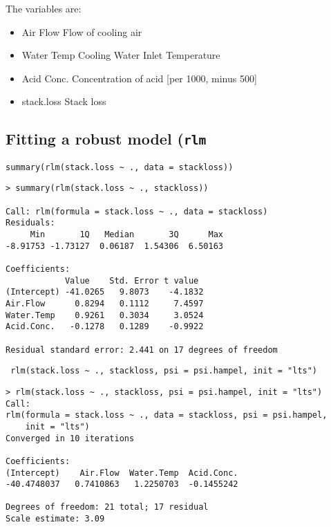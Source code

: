 The variables are: 
\begin{itemize}
\item	Air Flow	 Flow of cooling air
\item	Water Temp	 Cooling Water Inlet Temperature
\item	Acid Conc.	 Concentration of acid [per 1000, minus 500]
\item	stack.loss	 Stack loss
\end{itemize}

\subsection{Fitting a robust model (\texttt{rlm}}
\begin{framed}
\begin{verbatim}
summary(rlm(stack.loss ~ ., data = stackloss))
\end{verbatim}
\end{framed}
\begin{verbatim}
> summary(rlm(stack.loss ~ ., stackloss))

Call: rlm(formula = stack.loss ~ ., data = stackloss)
Residuals:
     Min       1Q   Median       3Q      Max 
-8.91753 -1.73127  0.06187  1.54306  6.50163 

Coefficients:
            Value    Std. Error t value 
(Intercept) -41.0265   9.8073    -4.1832
Air.Flow      0.8294   0.1112     7.4597
Water.Temp    0.9261   0.3034     3.0524
Acid.Conc.   -0.1278   0.1289    -0.9922

Residual standard error: 2.441 on 17 degrees of freedom
\end{verbatim}
\begin{framed}
\begin{verbatim}
 rlm(stack.loss ~ ., stackloss, psi = psi.hampel, init = "lts")
\end{verbatim}
\end{framed}
\begin{verbatim}
> rlm(stack.loss ~ ., stackloss, psi = psi.hampel, init = "lts")
Call:
rlm(formula = stack.loss ~ ., data = stackloss, psi = psi.hampel, 
    init = "lts")
Converged in 10 iterations

Coefficients:
(Intercept)    Air.Flow  Water.Temp  Acid.Conc. 
-40.4748037   0.7410863   1.2250703  -0.1455242 

Degrees of freedom: 21 total; 17 residual
Scale estimate: 3.09 
\end{verbatim}

